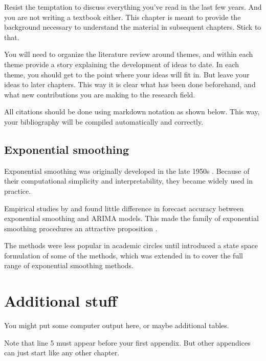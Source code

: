 \documentclass{aucklandthesis}
\begin{document}
Resist the temptation to discuss everything you've read in the last few years. And you are not writing a textbook either. This chapter is meant to provide the background necessary to understand the material in subsequent chapters. Stick to that.

You will need to organize the literature review around themes, and within each theme provide a story explaining the development of ideas to date. In each theme, you should get to the point where your ideas will fit in. But leave your ideas to later chapters. This way it is clear what has been done beforehand, and what new contributions you are making to the research field.

All citations should be done using markdown notation as shown below. This way, your bibliography will be compiled automatically and correctly.

\hypertarget{sec:expsmooth}{%
\section{Exponential smoothing}\label{sec:expsmooth}}

Exponential smoothing was originally developed in the late 1950s \autocite{Brown59,Brown63,Holt57,Winters60}. Because of their computational simplicity and interpretability, they became widely used in practice.

Empirical studies by \textcite{MH79} and \textcite{Metal82} found little difference in forecast accuracy between exponential smoothing and ARIMA models. This made the family of exponential smoothing procedures an attractive proposition \autocite[see][]{CKOS01}.

The methods were less popular in academic circles until \textcite{OKS97} introduced a state space formulation of some of the methods, which was extended in \textcite{HKSG02} to cover the full range of exponential smoothing methods.

\appendix

\hypertarget{additional-stuff}{%
\chapter{Additional stuff}\label{additional-stuff}}

You might put some computer output here, or maybe additional tables.

Note that line 5 must appear before your first appendix. But other appendices can just start like any other chapter.

\printbibliography[heading=bibintoc]
\end{document}
